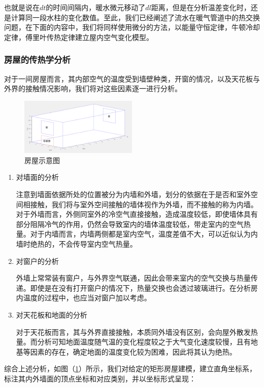 \documentclass{my_paper}
\begin{document}
也就是说在$ dt $的时间间隔内，暖水微元移动了$dl$距离，但是在分析温差变化时，还是计算同一段水柱的变化数值。至此，我们已经阐述了流水在暖气管道中的热交换问题，在下面的内容中，我们将同样使用微分的方法，以能量守恒定律，牛顿冷却定律，傅里叶传热定律建立屋内空气变化模型。

\subsubsection{房屋的传热学分析}

对于一间房屋而言，其内部空气的温度受到墙壁种类，开窗的情况，以及天花板与外界的接触情况影响，我们将对这些因素逐一进行分析。
\begin {figure}[h]
\centering %
\includegraphics[width=0.5\textwidth]{shinei.png}
\caption{房屋示意图} %
\label{shinei}
\end {figure}
\begin{enumerate}
    \item 对墙面的分析
    
    注意到墙面依据所处的位置被分为内墙和外墙\cite{3}，划分的依据在于是否和室外空间相接触，我们将与室外空间接触的墙体视作为外墙，而不接触的称为内墙。对于外墙而言，外侧同室外的冷空气直接接触，造成温度较低，即使墙体具有部分阻隔冷气的作用，仍然会导致室内的墙体温度较低，带走室内的空气热量。对于内墙而言，内墙两侧都是室内空气，温度差值不大，可以近似认为内墙时绝热的，不会传导室内空气热量。
    \item 对窗户的分析
    
    外墙上常常装有窗户，与外界空气联通，因此会带来室内的空气交换与热量传递。即使是在没有打开窗户的情况下，热量交换也会透过玻璃进行。在分析房内温度的过程中，也应当对窗户加以考虑。
    \item 对天花板和地面的分析
    
    对于天花板而言，其与外界直接接触，本质同外墙没有区别，会向屋外散发热量。而分析可知地面温度随气温的变化程度较之于大气变化速度较慢，且有地基等因素的存在，确定地面的温度变化较为困难，因此将其认为绝热。
    

\end{enumerate}

综合上述分析，如图（\ref{shinei}）所示，我们对给定的矩形房屋建模，建立直角坐标系，标注其内外墙面的顶点坐标和对应类别，并以坐标形式呈现：
\end{document}
